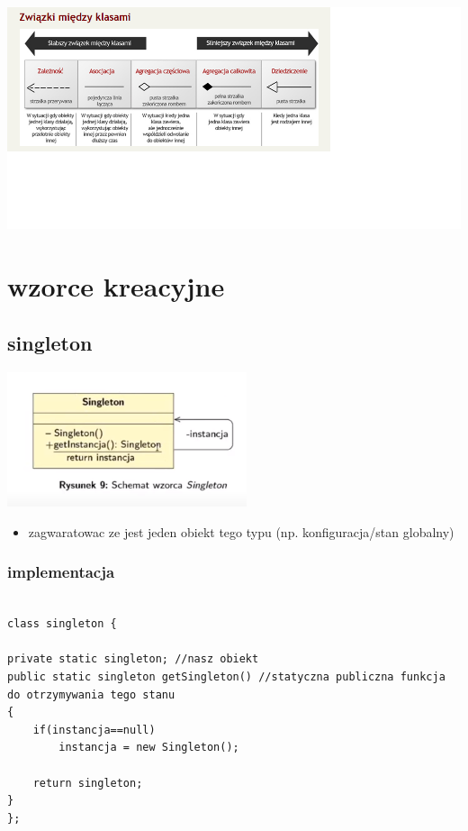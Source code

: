 \documentclass[11pt]{article}
\author{Patryk Kaniewski}
\date{\today}
\title{}
\begin{document}
\tableofcontents \clearpage\begin{center}
\includegraphics[width=.9\linewidth]{./zwiazki_UML.png}
\end{center}

\section{wzorce kreacyjne}
\label{sec:orga7a56ae}
\subsection{singleton}
\label{sec:org6a6d852}
\begin{center}
\includegraphics[width=.9\linewidth]{./singleton.png}
\end{center}
\begin{itemize}
\item zagwaratowac ze jest jeden obiekt tego typu (np. konfiguracja/stan globalny)
\end{itemize}
\subsubsection{implementacja}
\label{sec:org0403ba6}
\begin{verbatim}

class singleton {

private static singleton; //nasz obiekt
public static singleton getSingleton() //statyczna publiczna funkcja do otrzymywania tego stanu
{
	if(instancja==null)
		instancja = new Singleton();

	return singleton;
}
};

\end{verbatim}
\end{document}
